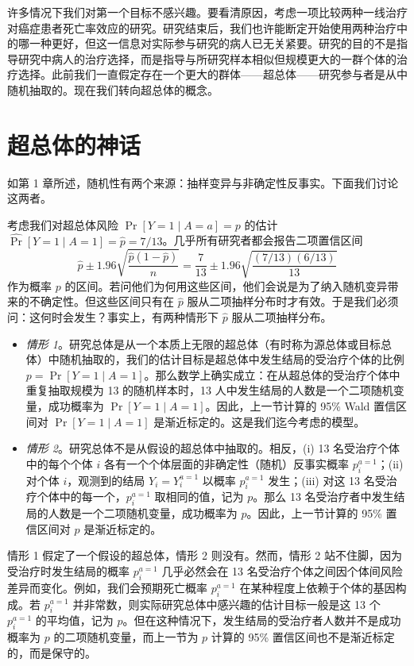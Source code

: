许多情况下我们对第一个目标不感兴趣。要看清原因，考虑一项比较两种一线治疗对癌症患者死亡率效应的研究。研究结束后，我们也许能断定开始使用两种治疗中的哪一种更好，但这一信息对实际参与研究的病人已无关紧要。研究的目的不是指导研究中病人的治疗选择，而是指导与所研究样本相似但规模更大的一群个体的治疗选择。此前我们一直假定存在一个更大的群体——超总体——研究参与者是从中随机抽取的。现在我们转向超总体的概念。

\section{超总体的神话}

如第 1 章所述，随机性有两个来源：抽样变异与非确定性反事实。下面我们讨论这两者。

考虑我们对超总体风险 $\Pr[Y=1\mid A=a]=p$ 的估计 $\widehat{\Pr}[Y=1\mid A=1]=\hat p=7/13$。几乎所有研究者都会报告二项置信区间
\[
\hat p\pm 1.96\sqrt{\frac{\hat p(1-\hat p)}{n}}=\frac{7}{13}\pm 1.96\sqrt{\frac{(7/13)(6/13)}{13}}
\]
作为概率 $p$ 的区间。若问他们为何用这些区间，他们会说是为了纳入随机变异带来的不确定性。但这些区间只有在 $\hat p$ 服从二项抽样分布时才有效。于是我们必须问：这何时会发生？事实上，有两种情形下 $\hat p$ 服从二项抽样分布。

\begin{itemize}
\item \emph{情形 1}。研究总体是从一个本质上无限的超总体（有时称为源总体或目标总体）中随机抽取的，我们的估计目标是超总体中发生结局的受治疗个体的比例 $p=\Pr[Y=1\mid A=1]$。那么数学上确实成立：在从超总体的受治疗个体中重复抽取规模为 13 的随机样本时，13 人中发生结局的人数是一个二项随机变量，成功概率为 $\Pr[Y=1\mid A=1]$。因此，上一节计算的 95\% Wald 置信区间对 $\Pr[Y=1\mid A=1]$ 是渐近标定的。这是我们迄今考虑的模型。
\item \emph{情形 2}。研究总体不是从假设的超总体中抽取的。相反，(i) 13 名受治疗个体中的每个个体 $i$ 各有一个个体层面的非确定性（随机）反事实概率 $p_i^{a=1}$；(ii) 对个体 $i$，观测到的结局 $Y_i=Y_i^{a=1}$ 以概率 $p_i^{a=1}$ 发生；(iii) 对这 13 名受治疗个体中的每一个，$p_i^{a=1}$ 取相同的值，记为 $p$。那么 13 名受治疗者中发生结局的人数是一个二项随机变量，成功概率为 $p$。因此，上一节计算的 95\% 置信区间对 $p$ 是渐近标定的。
\end{itemize}

情形 1 假定了一个假设的超总体，情形 2 则没有。然而，情形 2 站不住脚，因为受治疗时发生结局的概率 $p_i^{a=1}$ 几乎必然会在 13 名受治疗个体之间因个体间风险差异而变化。例如，我们会预期死亡概率 $p_i^{a=1}$ 在某种程度上依赖于个体的基因构成。若 $p_i^{a=1}$ 并非常数，则实际研究总体中感兴趣的估计目标一般是这 13 个 $p_i^{a=1}$ 的平均值，记为 $p$。但在这种情况下，发生结局的受治疗者人数并不是成功概率为 $p$ 的二项随机变量，而上一节为 $p$ 计算的 95\% 置信区间也不是渐近标定的，而是保守的。

